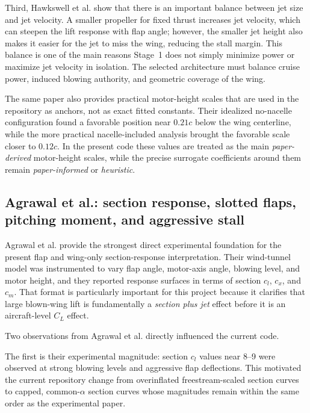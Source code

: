 \documentclass[conf]{new-aiaa}
\begin{document}
Third, Hawkswell et al. show that there is an important balance between jet size and jet velocity. A smaller propeller for fixed thrust increases jet velocity, which can steepen the lift response with flap angle; however, the smaller jet height also makes it easier for the jet to miss the wing, reducing the stall margin.\cite{Hawkswell2022} This balance is one of the main reasons Stage~1 does not simply minimize power or maximize jet velocity in isolation. The selected architecture must balance cruise power, induced blowing authority, and geometric coverage of the wing.

The same paper also provides practical motor-height scales that are used in the repository as anchors, not as exact fitted constants. Their idealized no-nacelle configuration found a favorable position near \(0.21c\) below the wing centerline, while the more practical nacelle-included analysis brought the favorable scale closer to \(0.12c\).\cite{Hawkswell2022} In the present code these values are treated as the main \emph{paper-derived} motor-height scales, while the precise surrogate coefficients around them remain \emph{paper-informed} or \emph{heuristic}.

\subsection{Agrawal et al.: section response, slotted flaps, pitching moment, and aggressive stall}

Agrawal et al. provide the strongest direct experimental foundation for the present flap and wing-only section-response interpretation.\cite{Agrawal2019} Their wind-tunnel model was instrumented to vary flap angle, motor-axis angle, blowing level, and motor height, and they reported response surfaces in terms of section \(c_l\), \(c_x\), and \(c_m\). That format is particularly important for this project because it clarifies that large blown-wing lift is fundamentally a \emph{section plus jet} effect before it is an aircraft-level \(C_L\) effect.

Two observations from Agrawal et al. directly influenced the current code.

The first is their experimental magnitude: section \(c_l\) values near 8--9 were observed at strong blowing levels and aggressive flap deflections.\cite{Agrawal2019} This motivated the current repository change from overinflated freestream-scaled section curves to capped, common-\(\alpha\) section curves whose magnitudes remain within the same order as the experimental paper.
\end{document}
